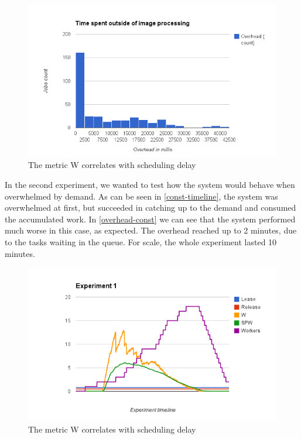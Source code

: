 \documentclass{stylesheet}
\begin{document}
\begin{figure}[b!]
	\centering
	\includegraphics[width=\linewidth]{overhead-exp2.png}
	\caption{The metric W correlates with scheduling delay}
	\label{fig:overhead-exp2}
\end{figure}

In the second experiment, we wanted to test how the system would behave when overwhelmed by demand. As can be seen in \cref{const-timeline}, the system was overwhelmed at first, but succeeded in catching up to the demand and consumed the accumulated work. In \cref{overhead-const} we can see that the system performed much worse in this case, as expected. The overhead reached up to 2 minutes, due to the tasks waiting in the queue. For scale, the whole experiment lasted 10 minutes. 

\begin{figure}[b!]
	\centering
	\includegraphics[width=\linewidth]{const-timeline.png}
	\caption{The metric W correlates with scheduling delay}
	\label{fig:const-timeline}
\end{figure}
\end{document}
